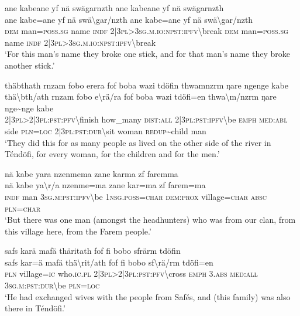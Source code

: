 \newpage
\ea\label{ex:5:a1476}
ane kabeane yf nä swägarnzth ane kabeane yf nä swägarnzth\\
\gll ane	kabe=ane	yf	nä	swä{\textbackslash}gar/nzth	ane	kabe=ane	yf	nä	swä{\textbackslash}gar/nzth\\
     \textsc{dem}	man=\textsc{poss}.\textsc{sg}	name	\textsc{indf}	2|3\textsc{pl}>3\textsc{sg}.\textsc{m}.\textsc{io}:\textsc{npst}:\textsc{ipfv}{\textbackslash}break	\textsc{dem}	man=\textsc{poss}.\textsc{sg}	name	\textsc{indf}	2|3\textsc{pl}>3\textsc{sg}.\textsc{m}.\textsc{io}:\textsc{npst}:\textsc{ipfv}{\textbackslash}break\\
\glt `For this man's name they broke one stick, and for that man's name they broke another stick.'
\z

\ea\label{ex:5:a1478}
thäbthath rnzam fobo erera fof boba wazi tdöfin thwamnzrm ŋare ngenge kabe\\
\gll thä{\textbackslash}bth/ath	rnzam	fobo	e{\textbackslash}rä/ra	fof	boba	wazi	tdöfi=en	thwa{\textbackslash}m/nzrm	ŋare	nge{\textasciitilde}nge	kabe\\
     2|3\textsc{pl}>2|3\textsc{pl}:\textsc{pst}:\textsc{pfv}{\textbackslash}finish	how\_many	\textsc{dist}:\textsc{all}	2|3\textsc{pl}:\textsc{pst}:\textsc{ipfv}{\textbackslash}be	\textsc{emph}	\textsc{med}:\textsc{abl}	side	\textsc{pln}=\textsc{loc}	2|3\textsc{pl}:\textsc{pst}:\textsc{dur}{\textbackslash}sit	woman	\textsc{redup}{\textasciitilde}child	man\\
\glt `They did this for as many people as lived on the other side of the river in Téndöfi, for every woman, for the children and for the men.'
\z

\ea\label{ex:5:a1481}
nä kabe yara nzenmema zane karma zf faremma\\
\gll nä	kabe	ya{\textbackslash}r/a	nzenme=ma	zane	kar=ma	zf	farem=ma\\
     \textsc{indf}	man	3\textsc{sg}.\textsc{m}:\textsc{pst}:\textsc{ipfv}{\textbackslash}be	1\textsc{nsg}.\textsc{poss}=\textsc{char}	\textsc{dem}:\textsc{prox}	village=\textsc{char}	\textsc{absc}	\textsc{pln}=\textsc{char}\\
\glt `But there was one man (amongst the headhunters) who was from our clan, from this village here, from the Farem people.'
\z

\ea\label{ex:5:a1484}
safs karä mafä thäritath fof fi bobo sfrärm tdöfin\\
\gll safs	kar=ä	mafä	thä{\textbackslash}rit/ath	fof	fi	bobo	sf{\textbackslash}rä/rm	tdöfi=en\\
     \textsc{pln}	village=\textsc{ic}	who.\textsc{ic}.\textsc{pl}	2|3\textsc{pl}>2|3\textsc{pl}:\textsc{pst}:\textsc{pfv}{\textbackslash}cross	\textsc{emph}	3.\textsc{abs}	\textsc{med}:\textsc{all}	3\textsc{sg}.\textsc{m}:\textsc{pst}:\textsc{dur}{\textbackslash}be	\textsc{pln}=\textsc{loc}\\
\glt `He had exchanged wives with the people from Safés, and (this family) was also there in Téndöfi.'
\z

